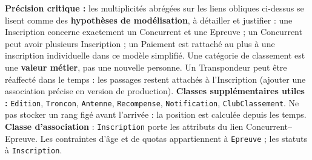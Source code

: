 \begin{center}
\end{center}
\textbf{Précision critique :} les multiplicités abrégées sur les liens obliques ci-dessus se lisent comme des \textbf{hypothèses de modélisation}, à détailler et justifier : une Inscription concerne exactement un Concurrent et une Epreuve ; un Concurrent peut avoir plusieurs Inscription ; un Paiement est rattaché au plus à une inscription individuelle dans ce modèle simplifié. Une catégorie de classement est une \textbf{valeur métier}, pas une nouvelle personne. Un Transpondeur peut être réaffecté dans le temps : les passages restent attachés à l'Inscription (ajouter une association précise en version de production).
\textbf{Classes supplémentaires utiles :} \texttt{Edition}, \texttt{Troncon}, \texttt{Antenne}, \texttt{Recompense}, \texttt{Notification}, \texttt{ClubClassement}. Ne pas stocker un rang figé avant l'arrivée : la position est calculée depuis les temps. \textbf{Classe d'association} : \texttt{Inscription} porte les attributs du lien Concurrent--Epreuve. Les contraintes d'âge et de quotas appartiennent à \texttt{Epreuve} ; les statuts à \texttt{Inscription}.

